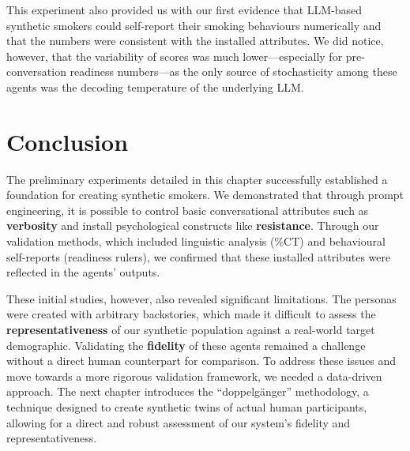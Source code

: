This experiment also provided us with our first evidence that LLM-based synthetic
smokers could self-report their smoking behaviours numerically and that the numbers
were consistent with the installed attributes. We did notice, however, that the
variability of scores was much lower---especially for pre-conversation readiness
numbers---as the only source of stochasticity among these agents was the decoding
temperature of the underlying LLM.

\section{Conclusion}
\label{sec:prelim-conclusion}

The preliminary experiments detailed in this chapter successfully established a
foundation for creating synthetic smokers. We demonstrated that through prompt
engineering, it is possible to control basic conversational attributes such as
\textbf{verbosity} and install psychological constructs like \textbf{resistance}.
Through our validation methods, which included linguistic analysis (\%CT) and
behavioural self-reports (readiness rulers), we confirmed that these installed
attributes were reflected in the agents' outputs.

These initial studies, however, also revealed significant limitations. The personas
were created with arbitrary backstories, which made it difficult to assess the
\textbf{representativeness} of our synthetic population against a real-world target
demographic. Validating the \textbf{fidelity} of these agents remained a challenge
without a direct human counterpart for comparison. To address these issues and move
towards a more rigorous validation framework, we needed a data-driven approach. The
next chapter introduces the ``doppelgänger'' methodology, a technique designed to
create synthetic twins of actual human participants, allowing for a direct and robust
assessment of our system's fidelity and representativeness.